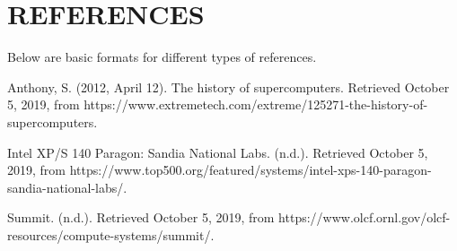 \documentclass[letterpaper, 10 pt, conference]{IEEEconf}
\begin{document}
\section*{REFERENCES}

Below are basic formats for different types of references.

\begin{enumerate}[label={[\arabic*]}]
\item Anthony, S. (2012, April 12). The history of supercomputers. Retrieved October 5, 2019, from https://www.extremetech.com/extreme/125271-the-history-of-supercomputers.
\item Intel XP/S 140 Paragon: Sandia National Labs. (n.d.). Retrieved October 5, 2019, from https://www.top500.org/featured/systems/intel-xps-140-paragon-sandia-national-labs/.
\item Summit. (n.d.). Retrieved October 5, 2019, from https://www.olcf.ornl.gov/olcf-resources/compute-systems/summit/.
\end{enumerate}
\end{document}
